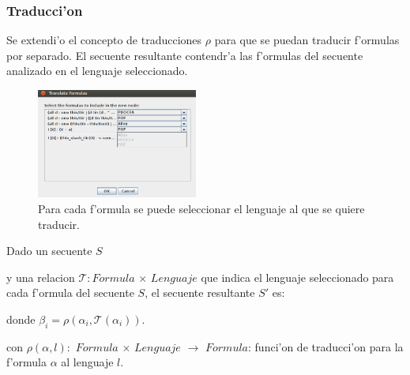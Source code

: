 \vspace{1em}
\subsubsection{Traducci'on}

Se extendi'o el concepto de traducciones $\rho$ para que se puedan traducir f'ormulas por separado. El secuente resultante contendr'a las f'ormulas del secuente analizado en el lenguaje seleccionado.

\begin{figure}[H]
	\includegraphics[width=200px]{img/translate.png}
	\centering
	\caption{Para cada f'ormula se puede seleccionar el lenguaje al que se quiere traducir.}
\end{figure}

Dado un secuente $S$

\begin{prooftree}
\end{prooftree}

y una relacion $\mathcal{T}:Formula$ $\times$ $Lenguaje$ que indica el lenguaje seleccionado para cada f'ormula del secuente $S$, el secuente resultante $S'$ es:

\begin{prooftree}
\end{prooftree}

donde $\beta_{i} = \rho(\alpha_i, \mathcal{T}(\alpha_i))$.

con $\rho(\alpha, l) :$ $Formula$ $\times$ $Lenguaje$ $\rightarrow$ $Formula$: funci'on de traducci'on para la f'ormula $\alpha$ al lenguaje $l$.

